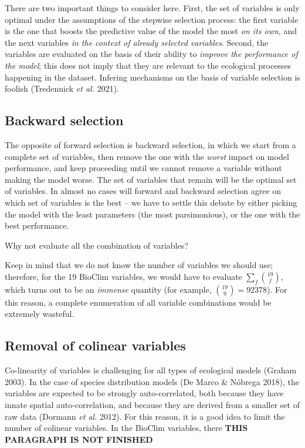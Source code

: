 \documentclass[
  letterpaper,
]{scrbook}
\begin{document}
There are two important things to consider here. First, the set of
variables is only optimal under the assumptions of the stepwise
selection process: the first variable is the one that boosts the
predictive value of the model the most \emph{on its own}, and the next
variables \emph{in the context of already selected variables}. Second,
the variables are evaluated on the basis of their ability to
\emph{improve the performance of the model}; this does not imply that
they are relevant to the ecological processes happening in the dataset.
Infering mechanisms on the basis of variable selection is foolish
(Tredennick \emph{et al.} 2021).

\subsection{Backward selection}\label{backward-selection}

The opposite of forward selection is backward selection, in which we
start from a complete set of variables, then remove the one with the
\emph{worst} impact on model performance, and keep proceeding until we
cannot remove a variable without making the model worse. The set of
variables that remain will be the optimal set of variables. In almost no
cases will forward and backward selection agree on which set of
variables is the best -- we have to settle this debate by either picking
the model with the least parameters (the most parsimonious), or the one
with the best performance.

Why not evaluate all the combination of variables?

Keep in mind that we do not know the number of variables we should use;
therefore, for the 19 BioClim variables, we would have to evaluate
\(\sum_f \binom{19}{f}\), which turns out to be an \emph{immense}
quantity (for example, \(\binom{19}{9}=92378\)). For this reason, a
complete enumeration of all variable combinations would be extremely
wasteful.

\subsection{Removal of colinear
variables}\label{removal-of-colinear-variables}

Co-linearity of variables is challenging for all types of ecological
models (Graham 2003). In the case of species distribution models (De
Marco \& Nóbrega 2018), the variables are expected to be strongly
auto-correlated, both because they have innate spatial auto-correlation,
and because they are derived from a smaller set of raw data (Dormann
\emph{et al.} 2012). For this reason, it is a good idea to limit the
number of colinear variables. In the BioClim variables, there
\textbf{THIS PARAGRAPH IS NOT FINISHED}
\end{document}

